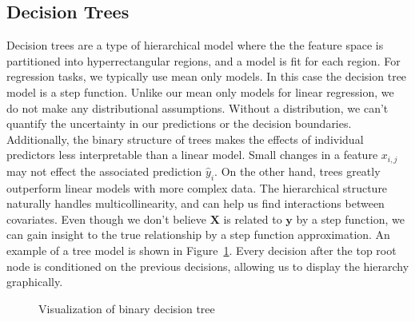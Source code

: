 \documentclass[
  12pt,
  letterpaper,
  DIV=11,
  numbers=noendperiod]{scrartcl}
\newcommand{\bm}{\mathbf}
\begin{document}
\subsection{Decision Trees}\label{decision-trees}

Decision trees are a type of hierarchical model where the the feature
space is partitioned into hyperrectangular regions, and a model is fit
for each region. For regression tasks, we typically use mean only
models. In this case the decision tree model is a step function. Unlike
our mean only models for linear regression, we do not make any
distributional assumptions. Without a distribution, we can't quantify
the uncertainty in our predictions or the decision boundaries.
Additionally, the binary structure of trees makes the effects of
individual predictors less interpretable than a linear model. Small
changes in a feature \(x_{i,j}\) may not effect the associated
prediction \(\hat y_i\). On the other hand, trees greatly outperform
linear models with more complex data. The hierarchical structure
naturally handles multicollinearity, and can help us find interactions
between covariates. Even though we don't believe \(\bm X\) is related to
\(\bm y\) by a step function, we can gain insight to the true
relationship by a step function approximation. An example of a tree
model is shown in Figure~\ref{fig-tree-examp}. Every decision after the
top root node is conditioned on the previous decisions, allowing us to
display the hierarchy graphically.

\begin{figure}


\caption{\label{fig-tree-examp}Visualization of binary decision tree}

\end{figure}%
\end{document}
